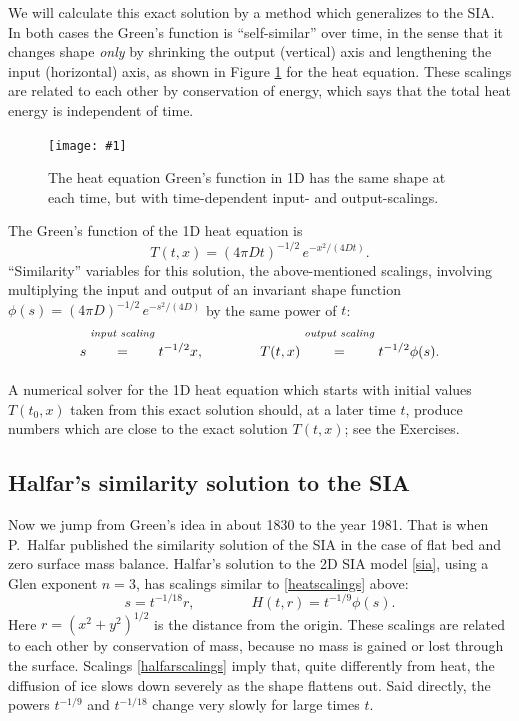 \documentclass[letterpaper,final,12pt,reqno]{amsart}
\newcommand{\onefigsize}[3]{
\begin{figure}[ht]
\centering
\texttt{[image: \#1]}
\caption{#2}
\label{fig:#1}
\end{figure}}
\begin{document}
We will calculate this exact solution by a method which generalizes to the SIA.  In both cases the Green's function is ``self-similar'' over time, in the sense that it changes shape \emph{only} by shrinking the output (vertical) axis and lengthening the input (horizontal) axis, as shown in Figure \ref{fig:heatscaling} for the heat equation.  These scalings are related to each other by conservation of energy, which says that the total heat energy is independent of time.

\onefigsize{heatscaling}{The heat equation Green's function in 1D has the same shape at each time, but with time-dependent input- and output-scalings.}{2.4in}

The Green's function of the 1D heat equation is
  $$T(t,x) = (4 \pi D t)^{-1/2}\, e^{-x^2/(4Dt)}.$$
``Similarity'' variables for this solution, the above-mentioned scalings, involving multiplying the input and output of an invariant shape function $\phi(s) = (4 \pi D)^{-1/2}\, e^{-s^2/(4D)}$ by the same power of $t$:
\begin{equation}
s \stackrel{\text{\emph{input scaling}}}{\phantom{\Big|}=\phantom{\Big|}} t^{-1/2} x, \qquad\qquad T(t,x) \stackrel{\text{\emph{output scaling}}}{\phantom{\Big|}=\phantom{\Big|}} t^{-1/2} \phi(s).  \label{heatscalings}
\end{equation}

A numerical solver for the 1D heat equation which starts with initial values $T(t_0,x)$ taken from this exact solution should, at a later time $t$, produce numbers which are close to the exact solution $T(t,x)$; see the Exercises.

\subsection*{Halfar's similarity solution to the SIA}  Now we jump from Green's idea in about 1830 to the year 1981.  That is when P.~Halfar published the similarity solution of the SIA in the case of flat bed and zero surface mass balance.  Halfar's solution to the 2D SIA model \eqref{sia}, using a Glen exponent $n=3$, has scalings similar to \eqref{heatscalings} above:
\begin{equation}
s = t^{-1/18} r, \qquad \qquad H(t,r)=t^{-1/9} \phi(s). \label{halfarscalings}
\end{equation}
Here $r=(x^2+y^2)^{1/2}$ is the distance from the origin.  These scalings are related to each other by conservation of mass, because no mass is gained or lost through the surface. Scalings \eqref{halfarscalings} imply that, quite differently from heat, the diffusion of ice slows down severely as the shape flattens out.  Said directly, the powers $t^{-1/9}$ and $t^{-1/18}$ change very slowly for large times $t$.
\end{document}
